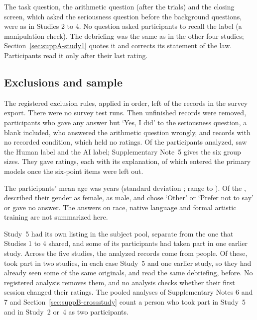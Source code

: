 The task question, the arithmetic question (after the trials) and the closing screen, which asked the seriousness question before the background questions, were as in Studies 2 to 4. No question asked participants to recall the label (a manipulation check). The debriefing was the same as in the other four studies; Section~\ref{sec:suppA-study1} quotes it and corrects its statement of the law. Participants read it only after their last rating.

\subsection*{Exclusions and sample}

The registered exclusion rules, applied in order, left \SFiveN{} of the \SFiveNRecords{} records in the survey export. There were no survey test runs. Then \SFiveNUnfinishedRemoved{} unfinished records were removed, \SFiveNNotSeriousRemoved{} participants who gave any answer but `Yes, I did' to the seriousness question, a blank included, \SFiveNArithmeticRemoved{} who answered the arithmetic question wrongly, and \SFiveNNoConditionRemoved{} records with no recorded condition, which held no ratings. Of the \SFiveN{} participants analyzed, \SFiveNHuman{} saw the Human label and \SFiveNAI{} the AI label; Supplementary Note~5 gives the six group sizes. They gave \SFiveNRatingsAll{} ratings, each with its explanation, of which \SFiveNRatings{} entered the primary models once the six-point items were left out.

The participants' mean age was \SFiveAgeMean{} years (standard deviation \SFiveAgeSD; range \SFiveAgeMin{} to \SFiveAgeMax). Of the \SFiveN, \SFiveNWomen{} described their gender as female, \SFiveNMen{} as male, and \SFiveNGenderOther{} chose `Other' or `Prefer not to say' or gave no answer. The answers on race, native language and formal artistic training are not summarized here.

Study~5 had its own listing in the subject pool, separate from the one that Studies 1 to 4 shared, and some of its participants had taken part in one earlier study. Across the five studies, the \NTotal{} analyzed records come from \NPeople{} people. Of these, \NPeopleRepeat{} took part in two studies, in each case Study~5 and one earlier study, so they had already seen some of the same originals, and read the same debriefing, before. No registered analysis removes them, and no analysis checks whether their first session changed their ratings. The pooled analyses of Supplementary Notes 6 and 7 and Section~\ref{sec:suppB-crossstudy} count a person who took part in Study~5 and in Study~2 or~4 as two participants.

